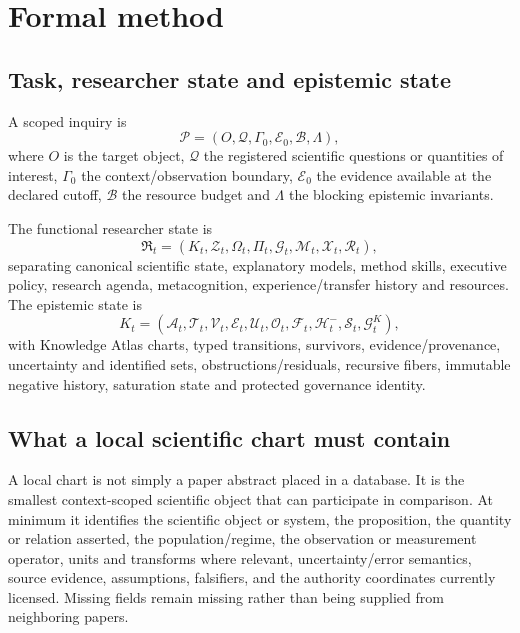 \section{Formal method}

\subsection{Task, researcher state and epistemic state}
A scoped inquiry is
\begin{equation}\mathcal P=(O,\mathcal Q,\Gamma_0,\mathcal E_0,\mathcal B,\Lambda),\end{equation}
where $O$ is the target object, $\mathcal Q$ the registered scientific questions or quantities of interest, $\Gamma_0$ the context/observation boundary, $\mathcal E_0$ the evidence available at the declared cutoff, $\mathcal B$ the resource budget and $\Lambda$ the blocking epistemic invariants.

The functional researcher state is
\begin{equation}\mathfrak R_t=(K_t,\mathcal Z_t,\Omega_t,\Pi_t,\mathcal G_t,\mathcal M_t,\mathcal X_t,\mathcal R_t),\end{equation}
separating canonical scientific state, explanatory models, method skills, executive policy, research agenda, metacognition, experience/transfer history and resources. The epistemic state is
\begin{equation}K_t=(\mathcal A_t,\mathcal T_t,\mathcal V_t,\mathcal E_t,\mathcal U_t,\mathcal O_t,\mathcal F_t,\mathcal H_t^{-},\mathcal S_t,\mathcal G_t^K),\end{equation}
with Knowledge Atlas charts, typed transitions, survivors, evidence/provenance, uncertainty and identified sets, obstructions/residuals, recursive fibers, immutable negative history, saturation state and protected governance identity.

\subsection{What a local scientific chart must contain}

A local chart is not simply a paper abstract placed in a database. It is the smallest context-scoped scientific object that can participate in comparison. At minimum it identifies the scientific object or system, the proposition, the quantity or relation asserted, the population/regime, the observation or measurement operator, units and transforms where relevant, uncertainty/error semantics, source evidence, assumptions, falsifiers, and the authority coordinates currently licensed. Missing fields remain missing rather than being supplied from neighboring papers.


